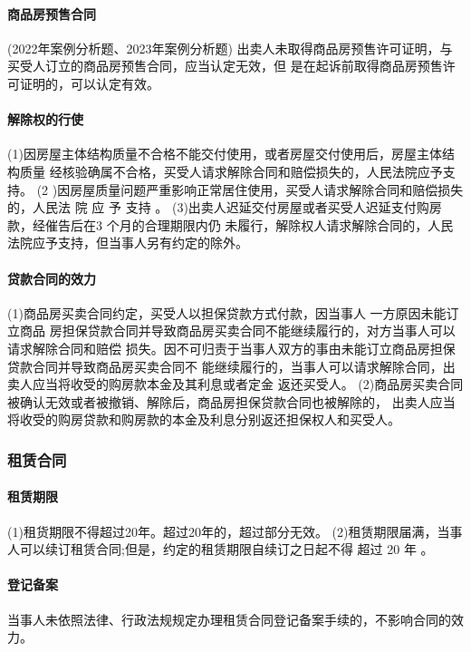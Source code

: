 \documentclass[UTF8,12pt]{ctexart}
\numberwithin{equation}{section} %
\numberwithin{figure}{section}
\numberwithin{table}{section}
\begin{document}
	\paragraph{商品房预售合同}(2022年案例分析题、2023年案例分析题) 出卖人未取得商品房预售许可证明，与买受人订立的商品房预售合同，应当认定无效，但 是在起诉前取得商品房预售许可证明的，可以认定有效。
	
	\paragraph{解除权的行使} (1)因房屋主体结构质量不合格不能交付使用，或者房屋交付使用后，房屋主体结构质量 经核验确属不合格，买受人请求解除合同和赔偿损失的，人民法院应予支持。
	(2 )因房屋质量问题严重影响正常居住使用，买受人请求解除合同和赔偿损失的，人民法 院 应 予 支持 。
	(3)出卖人迟延交付房屋或者买受人迟延支付购房款，经催告后在3 个月的合理期限内仍 未履行，解除权人请求解除合同的，人民法院应予支持，但当事人另有约定的除外。
	
	\paragraph{贷款合同的效力}
	(1)商品房买卖合同约定，买受人以担保贷款方式付款，因当事人 一方原因未能订立商品 房担保贷款合同并导致商品房买卖合同不能继续履行的，对方当事人可以请求解除合同和赔偿 损失。因不可归责于当事人双方的事由未能订立商品房担保贷款合同并导致商品房买卖合同不 能继续履行的，当事人可以请求解除合同，出卖人应当将收受的购房款本金及其利息或者定金 返还买受人。 (2)商品房买卖合同被确认无效或者被撤销、解除后，商品房担保贷款合同也被解除的， 出卖人应当将收受的购房贷款和购房款的本金及利息分别返还担保权人和买受人。
	
	\subsubsection{租赁合同}
	
	\paragraph{租赁期限}
	(1)租货期限不得超过20年。超过20年的，超过部分无效。 (2)租赁期限届满，当事人可以续订租赁合同;但是，约定的租赁期限自续订之日起不得 超过 20 年 。
	
	\paragraph{登记备案} 当事人未依照法律、行政法规规定办理租赁合同登记备案手续的，不影响合同的效力。
	
\end{document}
